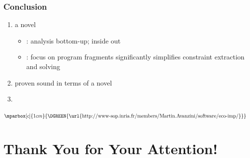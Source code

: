 \documentclass[
11pt,
usepdftitle=false,
aspectratio=169,
xcolor={table,usenames,dvipsnames},
]{beamer}
\begin{document}
  \begin{frame}
    \frametitle{Conclusion}

    \begin{enumerate}
    \item
      a novel 
      \smallskip
      \begin{itemize}
      \item {}: analysis bottom-up; inside out \smallskip
      \item {}: focus on program fragments significantly simplifies constraint extraction and solving
      \end{itemize}
      \bigskip
    \item
      proven sound in terms of a novel 
      \bigskip
    \item {}
    \end{enumerate}
  \begin{center}
      \small$\mparbox[c]{1cm}{\text{\DGREEN{\url{http://www-sop.inria.fr/members/Martin.Avanzini/software/eco-imp/}}}}$
    \end{center}
  \end{frame}

\section{Thank You for Your Attention!}



\end{document}
